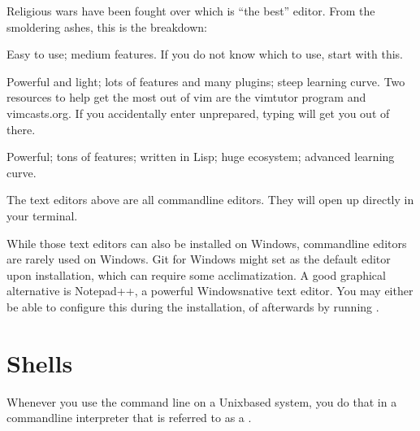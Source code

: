 \sphinxAtStartPar
Religious wars have been fought over which is “the best” editor. From the smoldering ashes,
this is the breakdown:
\begin{description}
\sphinxAtStartPar
Easy to use; medium features. If you do not know which to use, start with this.

\sphinxAtStartPar
Powerful and light; lots of features and many plugins; steep learning curve.
Two resources to help get the most out of vim are the vimtutor program
and vimcasts.org. If you accidentally enter  unprepared, typing 
will get you out of there.

\sphinxAtStartPar
Powerful; tons of features; written in Lisp; huge ecosystem; advanced learning curve.

\end{description}

\sphinxAtStartPar
The text editors above are all command\sphinxhyphen{}line editors.
They will open up directly in your terminal.

\ignorespaces 
\sphinxAtStartPar
While those text editors can also be installed on Windows, command\sphinxhyphen{}line editors are rarely used on Windows.
Git for Windows might set {\hyperref[\detokenize{glossary:term-vim}]{}} as the default editor upon installation, which can require some acclimatization.
A good graphical alternative is Notepad++, a powerful Windows\sphinxhyphen{}native text editor.
You may either be able to configure this during the installation, of afterwards by running .

\ignorespaces 

\section{Shells}
\label{\detokenize{intro/howto:shells}}\label{\detokenize{intro/howto:index-8}}
\sphinxAtStartPar
Whenever you use the command line on a Unix\sphinxhyphen{}based system, you do that in a command\sphinxhyphen{}line
interpreter that is referred to as a .

